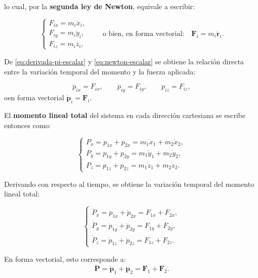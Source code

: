 \documentclass{article}
\begin{document}
lo cual, por la \textbf{segunda ley de Newton}, equivale a escribir:

\begin{equation}
\begin{cases}
F_{ix} = m_i \ddot{x}_i, \\[4pt]
F_{iy} = m_i \ddot{y}_i, \\[4pt]
F_{iz} = m_i \ddot{z}_i,
\end{cases}
\qquad \text{o bien, en forma vectorial:} \quad 
\boldsymbol{F}_i = m_i \ddot{\boldsymbol{r}}_i.
\label{eq:newton-escalar}
\end{equation}

De \eqref{eq:derivada-pi-escalar} y \eqref{eq:newton-escalar} se obtiene la relación directa entre la variación temporal del momento y la fuerza aplicada:

\[
\dot{p}_{ix} = F_{ix}, \qquad 
\dot{p}_{iy} = F_{iy}, \qquad 
\dot{p}_{iz} = F_{iz},
\]
oen forma vectorial
\(\dot{\boldsymbol{p}}_i = \boldsymbol{F}_i\).


El \textbf{momento lineal total} del sistema en cada dirección cartesiana se escribe entonces como:

\begin{equation}
\begin{cases}
P_x = p_{1x} + p_{2x} = m_1\dot{x}_1 + m_2\dot{x}_2, \\[4pt]
P_y = p_{1y} + p_{2y} = m_1\dot{y}_1 + m_2\dot{y}_2, \\[4pt]
P_z = p_{1z} + p_{2z} = m_1\dot{z}_1 + m_2\dot{z}_2.
\end{cases}
\label{eq:P-escalar}
\end{equation}

Derivando con respecto al tiempo, se obtiene la variación temporal del momento lineal total:

\begin{equation}
\begin{cases}
\dot{P}_x = \dot{p}_{1x} + \dot{p}_{2x} = F_{1x} + F_{2x}, \\[4pt]
\dot{P}_y = \dot{p}_{1y} + \dot{p}_{2y} = F_{1y} + F_{2y}, \\[4pt]
\dot{P}_z = \dot{p}_{1z} + \dot{p}_{2z} = F_{1z} + F_{2z}.
\end{cases}
\label{eq:variacion-momento-escalar}
\end{equation}

En forma vectorial, esto corresponde a:
\[
\dot{\boldsymbol{P}} = \dot{\boldsymbol{p}}_1 + \dot{\boldsymbol{p}}_2 = \boldsymbol{F}_1 + \boldsymbol{F}_2.
\]
\end{document}
